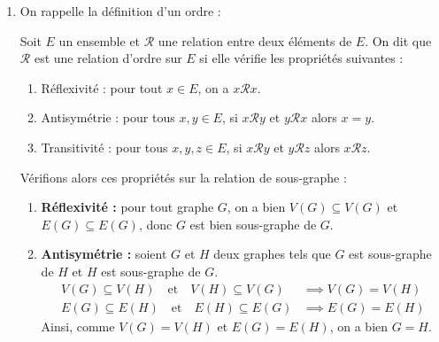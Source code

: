 \begin{td-sol}
    \begin{enumerate}
        \item On rappelle la définition d'un ordre :
        
        \begin{definition}
            Soit \(E\) un ensemble et \(\mathcal{R}\) une relation entre deux éléments de \(E\).
            On dit que \(\mathcal{R}\) est une relation d'ordre sur \(E\) si elle vérifie les propriétés suivantes :
            \begin{enumerate}[label=\roman*)]
                \item Réflexivité : pour tout \(x \in E\), on a \(x\mathcal{R}x\).
                \item Antisymétrie : pour tous \(x,y\in E\), si \(x\mathcal{R}y\) et \(y\mathcal{R}x\) alors \(x = y\).
                \item Transitivité : pour tous \(x,y,z\in E\), si \(x\mathcal{R}y\) et \(y\mathcal{R}z\) alors \(x\mathcal{R}z\).
            \end{enumerate}
        \end{definition}

        Vérifions alors ces propriétés sur la relation de sous-graphe :
        \begin{enumerate}[label=(\alph*)]
            \item \textbf{Réflexivité :} pour tout graphe \(G\), on a bien \(V(G) \subseteq V(G)\) et \(E(G) \subseteq E(G)\), donc \(G\) est bien sous-graphe de \(G\).

            \item \textbf{Antisymétrie :} soient \(G\) et \(H\) deux graphes tels que \(G\) est sous-graphe de \(H\) et \(H\) est sous-graphe de \(G\).
            \begin{equation*}
                \begin{aligned}
                    V(G) \subseteq V(H) \quad\text{et}\quad V(H) \subseteq V(G) &\implies V(G) = V(H) \\
                    E(G) \subseteq E(H) \quad\text{et}\quad E(H) \subseteq E(G) &\implies E(G) = E(H)
                \end{aligned}
            \end{equation*}
            Ainsi, comme \(V(G) = V(H)\) et \(E(G) = E(H)\), on a bien \(G = H\).


\end{enumerate}
\end{enumerate}
\end{td-sol}
